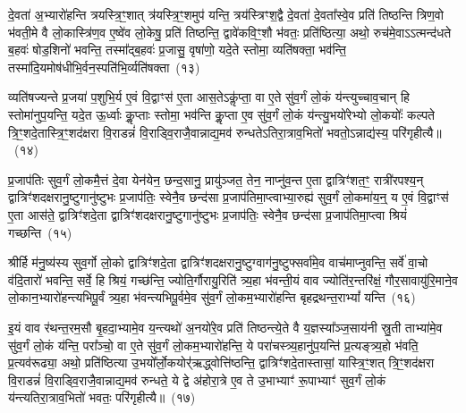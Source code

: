 दे॒वता॑ अ॒भ्यारो॑हन्ति त्रयस्त्रि॒ꣳ॒शात् त्र॑यस्त्रि॒ꣳ॒शमुप॑ यन्ति॒ त्रय॑स्त्रिꣳश॒द्वै दे॒वता॑ दे॒वता᳚स्वे॒व प्रति॑ तिष्ठन्ति त्रिण॒वो भ॑वती॒मे वै लो॒कास्त्रि॑ण॒व ए॒ष्वे॑व लो॒केषु॒ प्रति॑ तिष्ठन्ति॒ द्वावे॑कवि॒ꣳ॒शौ भ॑वतः॒ प्रति॑ष्ठित्या॒ अथो॒ रुच॑मे॒वा\-ऽऽ\-त्मन्द॑धते ब॒हवः॑ षोड॒शिनो॑ भवन्ति॒ तस्मा᳚द्\-ब॒हवः॑ प्र॒जासु॒ वृषा॑णो॒ यदे॒ते स्तोमा॒ व्यति॑षक्ता॒ भव॑न्ति॒ तस्मा॑दि॒यमोष॑धीभि॒र्वन॒स्पति॑भि॒र्व्यति॑षक्ता~(१३)\ip

व्यति॑षज्यन्ते प्र॒जया॑ प॒शुभि॒र्य ए॒वं वि॒द्वाꣳस॑ ए॒ता आस॒ते\-ऽकॢ॑प्ता॒ वा ए॒ते सु॑व॒र्गं लो॒कं य॑न्त्युच्चाव॒चान् हि स्तोमा॑नुप॒यन्ति॒ यदे॒त ऊ॒र्ध्वाः कॢ॒प्ताः स्तोमा॒ भव॑न्ति कॢ॒प्ता ए॒व सु॑व॒र्गं लो॒कं य॑न्त्यु॒भयो॑रेभ्यो लो॒कयोः᳚ कल्पते त्रि॒ꣳ॒शदे॒तास्त्रि॒ꣳ॒शद॑क्षरा वि॒राडन्नं॑ वि॒राड्वि॒राजै॒वान्नाद्य॒मव॑ रुन्धते\-ऽतिरा॒त्राव॒भितो॑ भवतो॒\-ऽन्नाद्य॑स्य॒ परि॑गृहीत्यै॥~(१४)\ip

{\anuvakamend[{ओष॑धीः संवथ्स॒र ए॒वाव॑ प्रति॒ष्ठाय॒ व्यति॑ष॒क्तैका॒न्नप॑ञ्चा॒शच्च॑}]}

प्र॒जा\-प॑तिः सुव॒र्गं लो॒कमै॒त्तं दे॒वा येन॑येन॒ छन्द॒सानु॒ प्रायु॑ञ्जत॒ तेन॒ नाप्नु॑व॒न्त ए॒ता द्वात्रिꣳ॑शत॒ꣳ॒ रात्री॑रपश्य॒न् द्वात्रिꣳ॑शदक्षरानु॒ष्टुगानु॑ष्टुभः प्र॒जा\-प॑तिः॒ स्वेनै॒व छन्द॑सा प्र॒जा\-प॑तिमा॒प्त्वाभ्या॒रुह्य॑ सुव॒र्गं लो॒कमा॑य॒न्॒ य ए॒वं वि॒द्वाꣳस॑ ए॒ता आस॑ते॒ द्वात्रिꣳ॑शदे॒ता द्वात्रिꣳ॑शदक्षरानु॒ष्टुगानु॑ष्टुभः प्र॒जा\-प॑तिः॒ स्वेनै॒व छन्द॑सा प्र॒जा\-प॑तिमा॒प्त्वा श्रियं॑ गच्छन्ति~(१५)\ip

श्रीर्\mbox{}हि म॑नु॒ष्य॑स्य सुव॒र्गो लो॒को द्वात्रिꣳ॑शदे॒ता द्वात्रिꣳ॑शदक्षरानु॒ष्टुग्वाग॑नु॒ष्टुफ्सर्वा॑मे॒व वाच॑माप्नुवन्ति॒ सर्वे॑ वा॒चो व॑दि॒तारो॑ भवन्ति॒ सर्वे॒ हि श्रियं॒ गच्छ॑न्ति॒ ज्योति॒र्गौरायु॒रिति॑ त्र्य॒हा भ॑वन्ती॒यं वाव ज्योति॑र॒न्तरि॑क्षं॒ गौर॒सावायु॑\-रि॒माने॒व लो॒कान॒भ्यारो॑हन्त्यभिपू॒र्वं त्र्य॒हा भ॑वन्त्यभिपू॒र्वमे॒व सु॑व॒र्गं लो॒कम॒भ्यारो॑हन्ति बृहद्रथन्त॒रा\-भ्यां᳚ यन्ति~(१६)\ip

इ॒यं वाव र॑थन्त॒रम॒सौ बृ॒हदा॒भ्यामे॒व य॒न्त्यथो॑ अ॒नयो॑रे॒व प्रति॑ तिष्ठन्त्ये॒ते वै य॒ज्ञस्या᳚ञ्ज॒साय॑नी स्रु॒ती ताभ्या॑मे॒व सु॑व॒र्गं लो॒कं य॑न्ति॒ परा᳚ञ्चो॒ वा ए॒ते सु॑व॒र्गं लो॒कम॒भ्यारो॑हन्ति॒ ये परा॑चस्त्र्य॒हानु॑प॒यन्ति॑ प्र॒त्यङ्त्र्य॒हो भ॑वति॒ प्र॒त्यव॑रूढ्या॒ अथो॒ प्रति॑ष्ठित्या उ॒भयो᳚र्लो॒कयोर्॑\mbox{}॑ऋद्ध्वोत्ति॑ष्ठन्ति॒ द्वात्रिꣳ॑शदे॒तास्तासां॒ यास्त्रि॒ꣳ॒शत् त्रि॒ꣳ॒शद॑क्षरा वि॒राडन्नं॑ वि॒राड्वि॒राजै॒वान्नाद्य॒मव॑ रुन्धते॒ ये द्वे अ॑होरा॒त्रे ए॒व ते उ॒भाभ्याꣳ॑ रू॒पाभ्याꣳ॑ सुव॒र्गं लो॒कं य॑न्त्यतिरा॒त्राव॒भितो॑ भवतः॒ परि॑गृहीत्यै॥~(१७)\ip

{\anuvakamend[{ग॒च्छ॒न्ति॒ य॒न्ति॒ त्रि॒ꣳ॒शद॑क्षरा॒ द्वाविꣳ॑शतिश्च}]}

